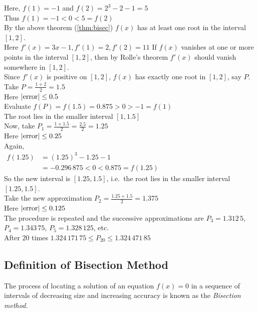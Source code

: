 \documentclass[12pt,class=book,crop=false]{standalone}
\begin{document}
\begin{soln}
    Here, \( f(1)=-1 \) and \( f(2)=2^3-2-1=5 \)\\
    Thus \( f(1)=-1<0<5=f(2) \)\\
    By the above theorem (\ref{thm:bisec}) \( f(x) \) has at least one root in the interval \( [1,2] \).\\
    Here \( f'(x)=3x-1, f'(1)=2, f'(2)=11 \)
    If \( f(x) \) vanishes at one or more points in the interval \( [1,2] \), then by Rolle's theorem \( f'(x) \) should vanish somewhere in \( [1,2] \).\\

    Since \( f'(x) \) is positive on \( [1,2] \), \( f(x) \) has exactly one root in \( [1,2] \), say \( P \).\\
    \indent Take \( P=\frac{1+2}{2}=1.5 \)\\
    \indent Here \( \left\vert\text{error}\right\vert\leq 0.5 \)\\
    Evaluate \( f(P)=f(1.5)=0.875>0>-1=f(1) \)\\
    The root lies in the smaller interval \( [1,1.5] \)\\
    Now,
    \indent take \( P_1=\frac{1+1.5}{2}=\frac{2.5}{2}=1.25 \)\\
    \indent Here \( \left\vert\text{error}\right\vert\leq 0.25 \)\\
    Again,\\
    \indent \( \begin{aligned}
        f(1.25) & =(1.25)^3-1.25-1             \\
                & =-0.296\,875<0<0.875=f(1.25)
    \end{aligned} \)\\
    So the new interval is \( [1.25,1.5] \), i.e.\ the root lies in the smaller interval \( [1.25,1.5] \).\\

    Take the new approximation \( P_2=\frac{1.25+1.5}{2}=1.375 \)\\
    \indent Here \( \left\vert\text{error}\right\vert\leq 0.125 \)\\
    The procedure is repeated and the successive approximations are \( P_3=1.312\,5 \), \( P_4=1.343\,75 \), \( P_5=1.328\,125 \), etc.\\
    After \( 20 \) times \( 1.324\,171\,75\leq P_{20}\leq 1.324\,471\,85 \)
\end{soln}
\subsection{Definition of Bisection Method}
The process of locating a solution of an equation \( f(x)=0 \) in a sequence of intervals of decreasing size and increasing accuracy is known as the \emph{Bisection method.}
\end{document}
